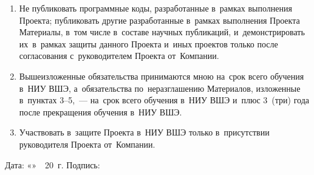 \documentclass[12pt,a4paper]{extarticle}
\begin{document}
\begin{enumerate}[leftmargin=1.4em, itemsep=5pt]
  \item Не публиковать программные коды, разработанные в~рамках выполнения Проекта;
        публиковать другие разработанные в~рамках выполнения Проекта Материалы,
        в~том числе в~составе научных публикаций, и~демонстрировать их~в~рамках
        защиты данного Проекта и~иных проектов только после согласования
        с~руководителем Проекта от~Компании.

  \item Вышеизложенные обязательства принимаются мною на~срок всего обучения в~НИУ
        ВШЭ, а~обязательства по~неразглашению Материалов, изложенные в~пунктах
        3--5,~--- на~срок всего обучения в~НИУ ВШЭ и~плюс 3~(три) года после
        прекращения обучения в~НИУ ВШЭ.

  \item Участвовать в~защите Проекта в~НИУ ВШЭ только в~присутствии руководителя
        Проекта от~Компании.
\end{enumerate}

\vspace{1.5em}

\noindent
Дата: «\underline{\hspace{1.2cm}}»~\underline{\hspace{3.5cm}}~20\underline{\hspace{0.6cm}}~г.
\hfill
Подпись: \underline{\hspace{4.5cm}}
\end{document}
